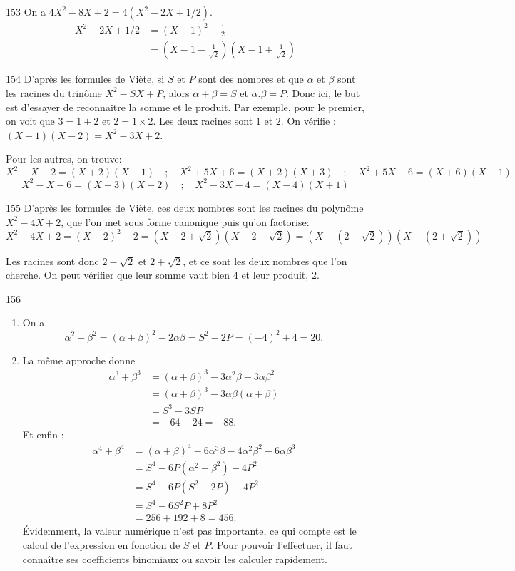 \begin{Soln}{153}
On a $4X^2-8X+2=4(X^2-2X+1/2)$.
\begin{align*}
X^2-2X+1/2 &= (X-1)^2 -\frac12\\
&= (X-1-\frac{1}{\sqrt 2})(X-1+\frac{1}{\sqrt 2})
\end{align*}
\end{Soln}
\begin{Soln}{154}
D'après les formules de Viète, si $S$ et $P$ sont des nombres et que $\alpha$ et $\beta$ sont les racines du trinôme $X^2-SX+P$, alors $\alpha+\beta =S$ et $\alpha.\beta = P$. Donc ici, le but est d'essayer de reconnaitre la somme et le produit. Par exemple, pour le premier, on \og voit\fg{} que $3=1+2$ et $2=1\times 2$. Les deux racines sont $1$ et $2$. On vérifie : $(X-1)(X-2) = X^2-3X+2$.


Pour les autres, on trouve:
\[
X^2-X-2= (X+2)(X-1)
\quad;\quad
X^2+5X+6 = (X+2)(X+3)
\quad;\quad
X^2+5X-6 = (X+6)(X-1)
\]
\[
X^2-X-6 = (X-3)(X+2)
\quad;\quad
X^2-3X-4 = (X-4)(X+1)
\]


\end{Soln}
\begin{Soln}{155}
D'après les formules de Viète, ces deux nombres sont les racines du polynôme $X^2-4X+2$, que l'on met sous forme canonique puis qu'on factorise:
\[X^2-4X+2 = (X-2)^2 -2 = (X-2+\sqrt 2)(X-2-\sqrt 2) = (X-(2-\sqrt 2))(X-(2+\sqrt 2))\]

Les racines sont donc  $2- \sqrt 2$ et $2+ \sqrt 2$, et ce sont les deux nombres que l'on cherche. On peut vérifier que leur somme vaut bien $4$ et leur produit, $2$.
\end{Soln}
\begin{Soln}{156}
\begin{enumerate}
\item On a
\[
\alpha^2+\beta^2 = (\alpha+\beta)^2-2\alpha\beta = \boxed{S^2-2P} = (-4)^2+4 = 20.
\]
\item La même approche donne
\begin{align*}
\alpha^3+\beta^3
&= (\alpha+\beta)^3-3\alpha^2\beta-3\alpha\beta^2  \\
&= (\alpha+\beta)^3 -3\alpha\beta(\alpha+\beta)\\
&= \boxed{S^3-3SP}\\
& = -64-24=-88.
\end{align*}
Et enfin :
\begin{align*}
\alpha^4+\beta^4
&= (\alpha+\beta)^4-6\alpha^3\beta-4\alpha^2\beta^2 -6\alpha\beta^3\\
&= S^4 - 6P(\alpha^2+\beta^2)-4P^2\\
&= S^4 - 6P(S^2-2P) - 4P^2\\
&= \boxed{S^4 - 6S^2P + 8P^2}\\
&= 256+192+8 = 456.
\end{align*}
Évidemment, la valeur numérique n'est pas importante, ce qui compte est le calcul de l'expression en fonction de $S$ et $P$. Pour pouvoir l'effectuer, il faut connaître ses coefficients binomiaux ou savoir les calculer rapidement.
\end{enumerate}
\end{Soln}
